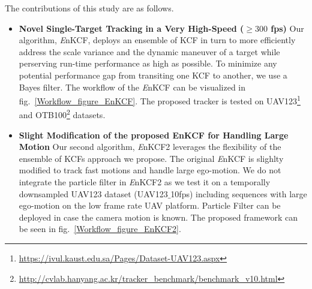 \documentclass{bmvc2k}
\begin{document}
The contributions of this study are as follows.
\begin{itemize}
\item \textbf{Novel Single-Target Tracking in a Very High-Speed ($\geq300$ fps) } Our
  algorithm, {\it E}nKCF, deploys an ensemble of KCF in turn to more
  efficiently address the scale variance and the dynamic maneuver of a
  target while perserving run-time performance as high as possible. To
  minimize any potential performance gap from transiting one KCF to
  another, we use a Bayes filter. The workflow of the  {\it E}nKCF can
  be visualized in fig.~\ref{Workflow_figure_EnKCF}. The proposed tracker is tested on UAV123\footnote{\url{https://ivul.kaust.edu.sa/Pages/Dataset-UAV123.aspx}} and OTB100\footnote{\url{http://cvlab.hanyang.ac.kr/tracker_benchmark/benchmark_v10.html}}
  datasets. 

\item \textbf{Slight Modification of the proposed EnKCF for Handling Large Motion} Our second algorithm, 
{\it E}nKCF2 leverages the flexibility of the ensemble of KCFs approach we propose. The original {\it E}nKCF is slighlty modified to track fast motions and handle large ego-motion. We do not integrate the particle filter in {\it E}nKCF2 as we test it on a temporally downsampled UAV123 dataset (UAV123$\_$10fps) including sequences with large ego-motion on the low frame rate UAV platform. Particle Filter can be deployed in case the camera motion is known. The proposed framework can be seen in fig.~\ref{Workflow_figure_EnKCF2}.

\end{itemize}
\end{document}
